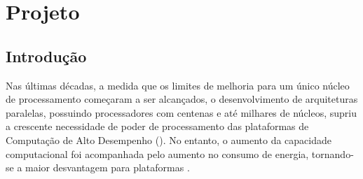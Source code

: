 \documentclass[
	12pt,				%
	openright,			%
	twoside,			%
	a4paper,			%
	english,			%
	brazil,				%
	]{abntex2}
\begin{document}




\tableofcontents*
\cleardoublepage



\textual


\chapter{Projeto}
\section{Introdução}

Nas últimas décadas, a medida que os limites de melhoria para um único núcleo de processamento começaram a ser alcançados, o desenvolvimento de arquiteturas paralelas, possuindo processadores com centenas e até milhares de núcleos, supriu a crescente necessidade de poder de processamento das plataformas de Computação de Alto Desempenho (\hpc).
No entanto, o aumento da capacidade computacional foi acompanhada pelo aumento no consumo de energia, tornando-se a maior desvantagem para plataformas \hpc.
\end{document}

